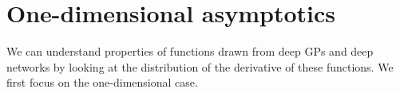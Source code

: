 \documentclass[twoside]{article}
\newcommand{\sectiondist}{}
\begin{document}





\section{One-dimensional asymptotics}
\sectiondist
\label{sec:1d}

We can understand properties of functions drawn from deep GPs and deep networks by looking at the distribution of the derivative of these functions. We first focus on the one-dimensional case.
\end{document}
